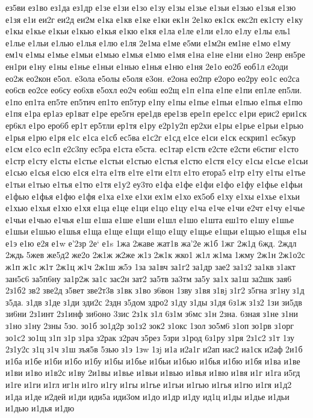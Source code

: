 {{ез5ви
ез1во
ез1да
ез1др
е1зе
е1зи
е1зо
е1зу
е1зы
е1зье
е1зьи
е1зью
е1зья
е1зю
е1зя
е1и
еи2г
еи2д
еи2м
е1ка
е1кв
е1ке
е1ки
ек1н
2е1ко
ек1ск
екс2п
ек1сту
е1ку
е1кы
е1кье
е1кьи
е1кью
е1кья
е1кю
е1кя
е1ла
е1ле
е1ли
е1ло
е1лу
е1лы
ель1
е1лье
е1льи
е1лью
е1лья
е1лю
е1ля
2е1ма
е1ме
е5ми
е1м2н
ем1не
е1мо
е1му
ем1ч
е1мы
е1мье
е1мьи
е1мью
е1мья
е1мю
е1мя
е1на
е1не
е1ни
е1но
2енр
ен5ре
ен1ри
е1ну
е1ны
е1нье
е1ньи
е1нью
е1нья
е1ню
е1ня
2е1о
ео2б
еоб1л
е2оди
ео2ж
ео2кон
е5ол.
е3ола
е5олы
е5оля
е3он.
е2она
ео2пр
е2оро
ео2ру
ео1с
ео2са
ео6св
ео2се
ео6су
ео6хв
е5охл
ео2ч
ео6ш
ео2щ
е1п
е1па
е1пе
е1пи
еп1ле
еп5ли.
е1по
еп1та
еп5те
еп5тич
еп1то
еп5тур
е1пу
е1пы
е1пье
е1пьи
е1пью
е1пья
е1пю
е1пя
е1ра
ер1аэ
ер1ват
е1ре
ере5гн
ере1дв
ере1зв
ере1п
ере1сс
е1ри
ерис2
ери1ск
ер6кл
е1ро
еро6б
ер1т
ер5тли
ер1тя
е1ру
е2р1у2п
ер2хи
е1ры
е1рье
е1рьи
е1рью
е1рья
е1рю
е1ря
е1с
е1са
е1сб
ес5ва
е1с2г
е1сд
е1се
е1си
е1ск
ескрип1
ес5кур
е1см
е1со
ес1п
е2с3пу
ес5ра
е1ста
е5ста.
ес1тар
е1ств
е2сте
е2сти
е6стиг
е1сто
е1стр
е1сту
е1сты
е1стье
е1стьи
е1стью
е1стья
е1стю
е1стя
е1су
е1сы
е1сье
е1сьи
е1сью
е1сья
е1сю
е1ся
е1та
е1тв
е1те
е1ти
е1тл
е1то
етора5
е1тр
е1ту
е1ты
е1тье
е1тьи
е1тью
е1тья
е1тю
е1тя
е1у2
еу3то
е1фа
е1фе
е1фи
е1фо
е1фу
е1фье
е1фьи
е1фью
е1фья
е1фю
е1фя
е1ха
е1хе
е1хи
ех1м
е1хо
ех5об
е1ху
е1хы
е1хье
е1хьи
е1хью
е1хья
е1хю
е1хя
е1ца
е1це
е1ци
е1цо
е1цу
е1ча
е1че
е1чи
е2чт
е1чу
е1чье
е1чьи
е1чью
е1чья
е1ш
е1ша
е1ше
е1ши
е1шл
е1шо
е1шта
еш1то
е1шу
е1шье
е1шьи
е1шью
е1шья
е1ща
е1ще
е1щи
е1що
е1щу
е1щье
е1щьи
е1щью
е1щья
е1ы
е1э
е1ю
е2я
е1w
е'2зр
2е`
е1s
1жа
2жаве
жат1в
жа'2е
ж1б
1жг
2ж1д
6жд.
2ждл
2ждь
5жев
же5д2
же2о
2ж1ж
ж2же
ж1з
2ж1к
жко1
ж1л
ж1ма
1жму
2ж1н
2ж1о2с
ж1п
ж1с
ж1т
2ж1ц
ж1ч
2ж1ш
ж5э
1за
за1вч
за1г2
за1др
зае2
за1з2
за1кв
з1акт
зан5с6
за5п6ну
за1р2ж
за1с
зас2н
зат2
за5тв
за3тм
за5у
за1х
за1ш
за2шк
зая6
2з1б2
зв2
зве2д
з5вет
зве2т3в
з1вк
з1во
з6вон
1зву
з1вя
з1вj
з1г2
з5гна
зг1ну
з1д
з5да.
з1дв
з1де
з1ди
зди2с
2здн
з5дом
здро2
з1ду
з1ды
з1дя
6з1ж
з1з2
1зи
зи5дв
зи6ни
2з1инт
2з1инф
зи6оно
3зис
2з1к
з1л
6з1м
з6мс
з1н
2зна.
6зная
з1не
з1ни
з1но
з1ну
2зны
5зо.
зо1б
зо1д2р
зо1з2
зок2
з1окс
1зол
зо5м6
з1оп
зо1рв
з1орг
зо1с2
зо1щ
з1п
з1р
з1ра
з2рак
з2рач
з5рез
5зри
з1род
6з1ру
з1ря
2з1с2
з1т
1зу
2з1у2с
з1ц
з1ч
з1ш
зъя5в
5зью
з1э
1зw
1зj
и1а
и2а1г
и2ап
иас2
иа1ск
и2аф
2и1б
и1ба
и1бе
и1би
и1бо
и1бу
и1бы
и1бье
и1бьи
и1бью
и1бья
и1бю
и1бя
и1ва
и1ве
и1ви
и1во
и1в2с
и1ву
2и1вы
и1вье
и1вьи
и1вью
и1вья
и1вю
и1вя
и1г
и1га
и5гд
и1ге
и1ги
и1гл
иг1н
и1го
и1гу
и1гы
и1гье
и1гьи
и1гью
и1гья
и1гю
и1гя
и1д2
и1да
и1де
и2дей
и1ди
иди5а
иди3ом
и1до
и1др
и1ду
ид1ц
и1ды
и1дье
и1дьи
и1дью
и1дья
и1дю
}}
